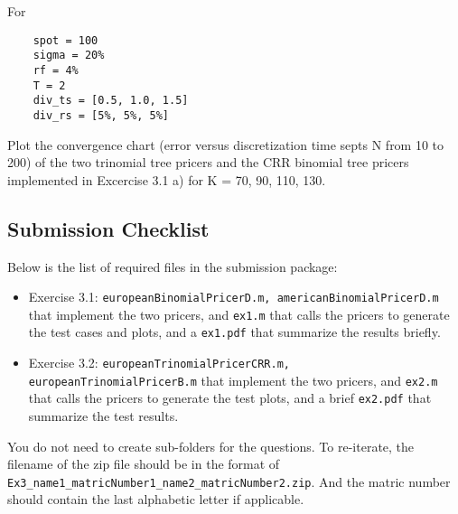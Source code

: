 \documentclass[12pt,a4paper,hidelinks,fleqn]{article}            %
\begin{document}
For 
\vspace{-1cm} 
\begin{verbatim}
    spot = 100
    sigma = 20%
    rf = 4%
    T = 2
    div_ts = [0.5, 1.0, 1.5]
    div_rs = [5%, 5%, 5%]
\end{verbatim} 

Plot the convergence chart (error versus discretization time septs N from 10 to 200) of the two trinomial tree pricers and the CRR binomial tree pricers implemented in Excercise 3.1 a) for K = 70, 90, 110, 130.

\subsection*{Submission Checklist}
Below is the list of required files in the submission package:
\begin{itemize}
\item Exercise 3.1: \verb=europeanBinomialPricerD.m, americanBinomialPricerD.m= that implement the two pricers, and \verb=ex1.m= that calls the pricers to generate the test cases and plots, and a \verb=ex1.pdf= that summarize the results briefly.
\item Exercise 3.2: \verb=europeanTrinomialPricerCRR.m, europeanTrinomialPricerB.m= that implement the two pricers, and \verb=ex2.m= that calls the pricers to generate the test plots, and a brief \verb=ex2.pdf= that summarize the test results.
\end{itemize}
You do not need to create sub-folders for the questions. 
To re-iterate, the filename of the zip file should be in the format of \verb=Ex3_name1_matricNumber1_name2_matricNumber2.zip=.
And the matric number should contain the last alphabetic letter if applicable. 
\end{document}
